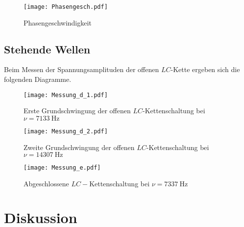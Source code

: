 \begin{figure}
  \texttt{[image: Phasengesch.pdf]}
  \caption{Phasengeschwindigkeit}
  \label{fig:Phasengesch}
\end{figure}

\subsection{Stehende Wellen}

Beim Messen der Spannungsamplituden der offenen $LC$-Kette ergeben sich die folgenden
Diagramme.

\begin{figure}
  \texttt{[image: Messung\_d\_1.pdf]}
  \caption{Erste Grundschwingung der offenen $LC$-Kettenschaltung bei $\nu = \SI{7133}{\hertz}$}
  \label{fig:Messungd1}
\end{figure}

\begin{figure}
  \texttt{[image: Messung\_d\_2.pdf]}
  \caption{Zweite Grundschwingung der offenen $LC$-Kettenschaltung bei $\nu = \SI{14307}{\hertz}$}
  \label{fig:Messungd2}
\end{figure}

\begin{figure}
  \texttt{[image: Messung\_e.pdf]}
  \caption{Abgeschlossene $LC-$Kettenschaltung bei $\nu = \SI{7337}{\hertz}$}
  \label{fig:Messunge}
\end{figure}

\section{Diskussion}

